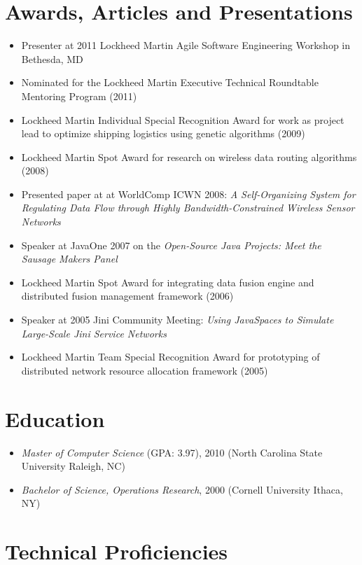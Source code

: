 \documentclass[11pt]{article}
\begin{document}
\section*{Awards, Articles and Presentations}
\label{sec-2}


\begin{itemize}
\item Presenter at 2011 Lockheed Martin Agile Software Engineering
    Workshop in Bethesda, MD
\item Nominated for the Lockheed Martin Executive Technical Roundtable
    Mentoring Program (2011)
\item Lockheed Martin Individual Special Recognition Award for work as
    project lead to optimize shipping logistics using genetic
    algorithms (2009)
\item Lockheed Martin Spot Award for research on wireless data routing
    algorithms (2008)
\item Presented paper at at WorldComp ICWN 2008: \emph{A Self-Organizing System for Regulating Data Flow through Highly Bandwidth-Constrained Wireless Sensor Networks}
\item Speaker at JavaOne 2007 on the \emph{Open-Source Java Projects: Meet     the Sausage Makers Panel}
\item Lockheed Martin Spot Award for integrating data fusion engine and
    distributed fusion management framework (2006)
\item Speaker at 2005 Jini Community Meeting: \emph{Using JavaSpaces to     Simulate Large-Scale Jini Service Networks}
\item Lockheed Martin Team Special Recognition Award for prototyping of
    distributed network resource allocation framework (2005)
\end{itemize}
\section*{Education}
\label{sec-3}


\begin{itemize}
\item \emph{Master of Computer Science} (GPA: 3.97), 2010 (North Carolina
    State University Raleigh, NC)
\item \emph{Bachelor of Science, Operations Research}, 2000 (Cornell
    University Ithaca, NY)
\end{itemize}
\section*{Technical Proficiencies}
\label{sec-4}
\end{document}
